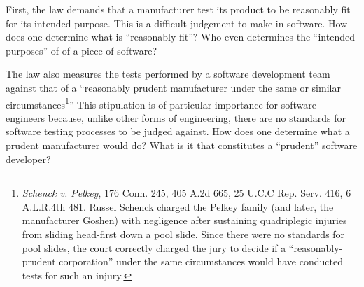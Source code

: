 First, the law demands that a manufacturer test its product to be reasonably fit
for its intended purpose.
 This is a
difficult judgement to make in software. How does one determine what is
``reasonably fit''? Who even determines the ``intended purposes'' of of a piece
of software?

The law also measures the tests performed by a software development team against
that of a ``reasonably prudent manufacturer under the same or similar 
circumstances\footnote{\textit{Schenck v. Pelkey}, 176 Conn. 245,
405 A.2d 665, 25 U.C.C Rep. Serv. 416, 6 A.L.R.4th 481. Russel Schenck charged
the Pelkey family (and later, the manufacturer Goshen) with negligence after
sustaining quadriplegic injuries from sliding head-first down a pool slide.
Since there were no standards for pool slides, the court correctly charged the
jury to decide if a ``reasonably-prudent corporation'' under the same 
circumstances would have conducted tests for such an injury.}'' This stipulation
is of particular importance for software engineers because, unlike other forms
of engineering, there are no standards for software testing processes to be
judged against. How does one
determine what a prudent manufacturer would do? What is it that constitutes a
``prudent'' software developer?

